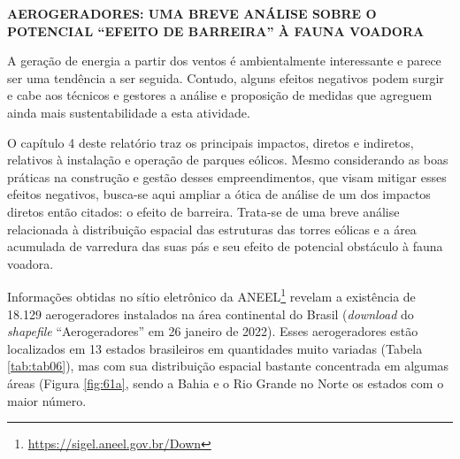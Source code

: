 \documentclass[
  oneside]{scrbook}
\DeclareRobustCommand{\href}[2]{#2\footnote{\url{#1}}}
\begin{document}
\begin{blackbox}

\begin{center}
\textbf{AEROGERADORES: UMA BREVE ANÁLISE SOBRE O POTENCIAL ``EFEITO DE BARREIRA'' À FAUNA VOADORA}

\end{center}

A geração de energia a partir dos ventos é ambientalmente interessante e parece ser uma tendência a ser seguida. Contudo, alguns efeitos negativos podem surgir e cabe aos técnicos e gestores a análise e proposição de medidas que agreguem ainda mais sustentabilidade a esta atividade.

O capítulo 4 deste relatório traz os principais impactos, diretos e indiretos, relativos à instalação e operação de parques eólicos. Mesmo considerando as boas práticas na construção e gestão desses empreendimentos, que visam mitigar esses efeitos negativos, busca-se aqui ampliar a ótica de análise de um dos impactos diretos então citados: o efeito de barreira. Trata-se de uma breve análise relacionada à distribuição espacial das estruturas das torres eólicas e a área acumulada de varredura das suas pás e seu efeito de potencial obstáculo à fauna voadora.

Informações obtidas no \href{https://sigel.aneel.gov.br/Down}{sítio eletrônico da ANEEL} revelam a existência de 18.129 aerogeradores instalados na área continental do Brasil (\emph{download} do \emph{shapefile} ``Aerogeradores'' em 26 janeiro de 2022). Esses aerogeradores estão localizados em 13 estados brasileiros em quantidades muito variadas (Tabela \ref{tab:tab06}), mas com sua distribuição espacial bastante concentrada em algumas áreas (Figura \ref{fig:61a}, sendo a Bahia e o Rio Grande no Norte os estados com o maior número.

\end{blackbox}
\end{document}
